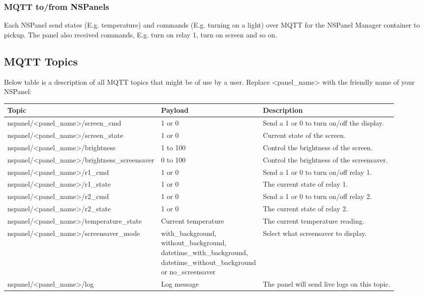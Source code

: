 \documentclass[10pt]{article}
\begin{document}
    \subsubsection{MQTT to/from NSPanels}
    Each NSPanel send states (E.g. temperature) and commands (E.g. turning on a light) over MQTT for the NSPanel Manager container to pickup. The panel also received commands, E.g. turn on relay 1, turn on screen and so on.

    \subsection{MQTT Topics}
    Below table is a description of all MQTT topics that might be of use by a user. Replace <panel\_name> with the friendly name of your NSPanel:
    \begin{table}[H]
    \begin{tabular}{|l|l|l|}
    \hline
    \textbf{Topic} & \textbf{Payload}  & \textbf{Description}  \\ \hline
    nspanel/<panel\_name>/screen\_cmd & 1 or 0 & Send a 1 or 0 to turn on/off the display. \\ \hline
    nspanel/<panel\_name>/screen\_state & 1 or 0 & Current state of the screen. \\ \hline
    nspanel/<panel\_name>/brightness & 1 to  100 & Control the brightness of the screen. \\ \hline
    nspanel/<panel\_name>/brightness\_screensaver & 0 to  100 & Control the brightness of the screensaver. \\ \hline
    nspanel/<panel\_name>/r1\_cmd & 1 or 0 & Send a 1 or 0 to turn on/off relay 1. \\ \hline
    nspanel/<panel\_name>/r1\_state & 1 or 0 & The current state of relay 1. \\ \hline
    nspanel/<panel\_name>/r2\_cmd & 1 or 0 & Send a 1 or 0 to turn on/off relay 2. \\ \hline
    nspanel/<panel\_name>/r2\_state & 1 or 0 & The current state of relay 2. \\ \hline
    nspanel/<panel\_name>/temperature\_state & Current temperature & The current temperature reading. \\ \hline
    nspanel/<panel\_name>/screensaver\_mode & \parbox[t]{0.3\textwidth}{with\_background,\\ without\_background,\\ datetime\_with\_background,\\ datetime\_without\_background\\ or no\_screensaver} & Select what screensaver to display. \\ \hline
    nspanel/<panel\_name>/log & Log message & The panel will send live logs on this topic. \\ \hline
    \end{tabular}
    \end{table}
\end{document}
